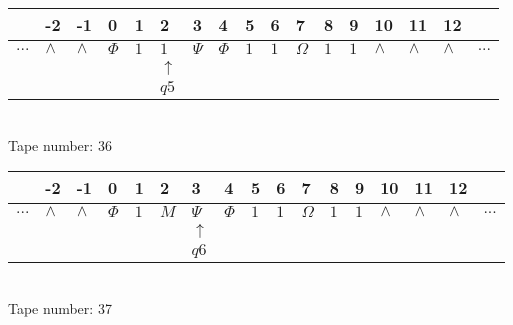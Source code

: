 \documentclass{article}
\begin{document}
\begin{table}[H]
\centering
\begin{tabular}{lllllllllllllllll}
 & -2 & -1 & 0 & 1 & 2 & 3 & 4 & 5 & 6 & 7 & 8 & 9 & 10 & 11 & 12 & \\
\hline
$...$ & \multicolumn{1}{|l|}{$\wedge$} & \multicolumn{1}{|l|}{$\wedge$} & \multicolumn{1}{|l|}{$\Phi$} & \multicolumn{1}{|l|}{$1$} & \multicolumn{1}{|l|}{$1$} & \multicolumn{1}{|l|}{$\Psi$} & \multicolumn{1}{|l|}{$\Phi$} & \multicolumn{1}{|l|}{$1$} & \multicolumn{1}{|l|}{$1$} & \multicolumn{1}{|l|}{$\Omega$} & \multicolumn{1}{|l|}{$1$} & \multicolumn{1}{|l|}{$1$} & \multicolumn{1}{|l|}{$\wedge$} & \multicolumn{1}{|l|}{$\wedge$} & \multicolumn{1}{|l|}{$\wedge$} & $...$\\
\hline
&  &  &  &  & $\uparrow$ &  &  &  &  &  &  &  &  &  &  &  \\
&  &  &  &  & $ q5 $ &  &  &  &  &  &  &  &  &  &  &  \\
\end{tabular}
\\
Tape number: 36
\noindent\makebox[\linewidth]{\hdashrule{\textwidth}{1pt}{1pt}}\end{table}

\begin{table}[H]
\centering
\begin{tabular}{lllllllllllllllll}
 & -2 & -1 & 0 & 1 & 2 & 3 & 4 & 5 & 6 & 7 & 8 & 9 & 10 & 11 & 12 & \\
\hline
$...$ & \multicolumn{1}{|l|}{$\wedge$} & \multicolumn{1}{|l|}{$\wedge$} & \multicolumn{1}{|l|}{$\Phi$} & \multicolumn{1}{|l|}{$1$} & \multicolumn{1}{|l|}{$M$} & \multicolumn{1}{|l|}{$\Psi$} & \multicolumn{1}{|l|}{$\Phi$} & \multicolumn{1}{|l|}{$1$} & \multicolumn{1}{|l|}{$1$} & \multicolumn{1}{|l|}{$\Omega$} & \multicolumn{1}{|l|}{$1$} & \multicolumn{1}{|l|}{$1$} & \multicolumn{1}{|l|}{$\wedge$} & \multicolumn{1}{|l|}{$\wedge$} & \multicolumn{1}{|l|}{$\wedge$} & $...$\\
\hline
&  &  &  &  &  & $\uparrow$ &  &  &  &  &  &  &  &  &  &  \\
&  &  &  &  &  & $ q6 $ &  &  &  &  &  &  &  &  &  &  \\
\end{tabular}
\\
Tape number: 37
\noindent\makebox[\linewidth]{\hdashrule{\textwidth}{1pt}{1pt}}\end{table}
\end{document}
